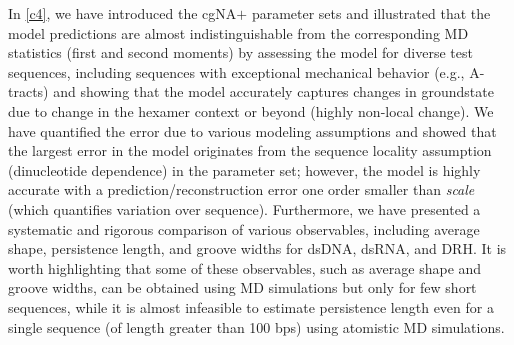 In \cref{c4}, we have introduced the cgNA$+$ parameter sets and illustrated that the model predictions are almost indistinguishable from the corresponding MD statistics (first and second moments) by assessing the model for diverse test sequences, including sequences with exceptional mechanical behavior (e.g., A-tracts) and showing that the model accurately captures changes in groundstate due to change in the hexamer context or beyond (highly non-local change).
We have quantified the error due to various modeling assumptions and showed that the largest error in the model originates from the sequence locality assumption (dinucleotide dependence) in the parameter set; however, the model is highly accurate with a prediction/reconstruction error one order smaller than \textit{scale} (which quantifies variation over sequence).
Furthermore, we have presented a systematic and rigorous comparison of various observables, including average shape, persistence length, and groove widths for dsDNA, dsRNA, and DRH. 
It is worth highlighting that some of these observables, such as average shape and groove widths, can be obtained using MD simulations but only for few short sequences, while it is almost infeasible to estimate persistence length even for a single sequence (of length greater than 100 bps) using atomistic MD simulations.


